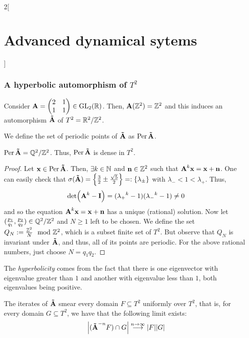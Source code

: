 \documentclass[../../../main_math.tex]{subfiles}
\begin{document}
\begin{multicols}{2}[\section{Advanced dynamical sytems}]
  \subsubsection{A hyperbolic automorphism of \texorpdfstring{$T^2$}{T2}}
  \begin{proposition}
    Consider $\boldsymbol{\mathrm{A}}=\begin{pmatrix}
        2 & 1 \\
        1 & 1
      \end{pmatrix}\in \mathrm{GL}_2(\mathbb{R})$. Then, $\boldsymbol{\mathrm{A}}(\mathbb{Z}^2)=\mathbb{Z}^2$ and this induces an automorphism $\boldsymbol{\mathrm{\tilde{A}}}$ of $T^2=\quot{\RR^2}{\ZZ^2}$.
  \end{proposition}
  \begin{definition}
    We define the set of periodic points of $\boldsymbol{\mathrm{\tilde{A}}}$ as $\operatorname{Per}\boldsymbol{\mathrm{\tilde{A}}}$.
  \end{definition}
  \begin{lemma}
    $\Per\vf{\tilde{A}}=\quot{\QQ^2}{\ZZ^2}$. Thus, $\operatorname{Per}\boldsymbol{\mathrm{\tilde{A}}}$ is dense in $T^2$.
  \end{lemma}
  \begin{proof}
    Let $\boldsymbol{\mathrm{x}}\in \operatorname{Per}\boldsymbol{\mathrm{\tilde{A}}}$. Then, $\exists k\in\mathbb{N}$ and $\boldsymbol{\mathrm{n}}\in\mathbb{Z}^2$ such that $\boldsymbol{\mathrm{A}}^k\boldsymbol{\mathrm{x}}=\boldsymbol{\mathrm{x}}+\boldsymbol{\mathrm{n}}$. One can easily check that $\sigma(\boldsymbol{\mathrm{\tilde{A}}})=\left\{\frac{3}{2}\pm \frac{\sqrt{5}}{2}\right\}=:\{\lambda_{\pm}\}$ with $\lambda_-<1<\lambda_+$. Thus,
    $$
      \det(\boldsymbol{\mathrm{A}}^k-\boldsymbol{\mathrm{I}})=({\lambda_+}^k-1)({\lambda_-}^k-1)\ne 0
    $$
    and so the equation $\boldsymbol{\mathrm{A}}^k\boldsymbol{\mathrm{x}}=\boldsymbol{\mathrm{x}}+\boldsymbol{\mathrm{n}}$ has a unique (rational) solution. Now let $(\frac{p_1}{q_1},\frac{p_2}{q_2})\in \quot{\QQ^2}{\ZZ^2}$ and $N\geq 1$ left to be chosen. We define the set $Q_N:=\frac{\mathbb{Z}^2}{N} \mod{\mathbb{Z}^2}$, which is a subset finite set of $T^2$. But observe that $Q_N$ is invariant under $\boldsymbol{\mathrm{\tilde{A}}}$, and thus, all of its points are periodic. For the above rational numbers, just choose $N=q_1q_2$.
  \end{proof}
  \begin{remark}
    The \emph{hyperbolicity} comes from the fact that there is one eigenvector with eigenvalue greater than $1$ and another with eigenvalue less than $1$, both eigenvalues being positive.
  \end{remark}
  \begin{theorem}
    The iterates of $\boldsymbol{\mathrm{\tilde{A}}}$ smear every domain $F\subseteq T^2$ uniformly over $T^2$, that is, for every domain $G\subseteq T^2$, we have that the following limit exists:
    $$
      \abs{(\boldsymbol{\mathrm{\tilde{A}}}^{-n} F)\cap G}\overset{n\to\infty}{\longrightarrow} \abs{F}\abs{G}
$$
\end{theorem}
\end{multicols}
\end{document}
